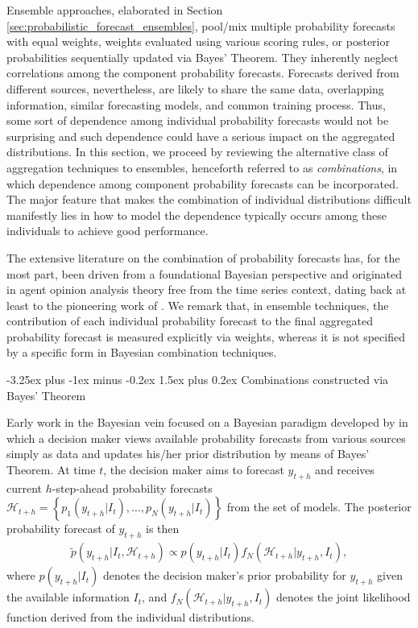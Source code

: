\documentclass[11pt]{article}
\makeatletter
\renewcommand{\paragraph}{\@startsection{paragraph}{4}{0ex}%
   {-3.25ex plus -1ex minus -0.2ex}%
   {1.5ex plus 0.2ex}%
   {\normalfont\normalsize\bfseries}}
\makeatother
\begin{document}
Ensemble approaches, elaborated in Section \ref{sec:probabilistic_forecast_ensembles}, pool/mix multiple probability forecasts with equal weights, weights evaluated using various scoring rules, or posterior probabilities sequentially updated via Bayes' Theorem. They inherently neglect correlations among the component probability forecasts. Forecasts derived from different sources, nevertheless, are likely to share the same data, overlapping information, similar forecasting models, and common training process. Thus, some sort of dependence among individual probability forecasts would not be surprising and such dependence could have a serious impact on the aggregated distributions. In this section, we proceed by reviewing the alternative class of aggregation techniques to ensembles, henceforth referred to as \textit{combinations}, in which dependence among component probability forecasts can be incorporated. The major feature that makes the combination of individual distributions difficult manifestly lies in how to model the dependence typically occurs among these individuals to achieve good performance.

The extensive literature on the combination of probability forecasts has, for the most part, been driven from a foundational Bayesian perspective and originated in agent opinion analysis theory free from the time series context, dating back at least to the pioneering work of \cite{Winkler1968-uw}. We remark that, in ensemble techniques, the contribution of each individual probability forecast to the final aggregated probability forecast is measured explicitly via weights, whereas it is not specified by a specific form in Bayesian combination techniques.

\paragraph{Combinations constructed via Bayes' Theorem}

Early work in the Bayesian vein focused on a Bayesian paradigm developed by \cite{Morris1974-yh,Morris1977-xl} in which a decision maker views available probability forecasts from various sources simply as data and updates his/her prior distribution by means of Bayes' Theorem. At time $t$, the decision maker aims to forecast $y_{t+h}$ and receives current $h$-step-ahead probability forecasts $\mathcal{H}_{t+h} = \left\{p_{1}(y_{t+h}|I_{t}), \ldots, p_{N}(y_{t+h}|I_{t})\right\}$ from the set of models. The posterior probability forecast of $y_{t+h}$ is then
\begin{align}
\label{eq:bayes_theorem}
\tilde{p}\left(y_{t+h} | I_{t}, \mathcal{H}_{t+h}\right) \propto p\left(y_{t+h} | I_{t}\right) f_{N}\left(\mathcal{H}_{t+h} | y_{t+h}, I_{t}\right),
\end{align}
where $p\left(y_{t+h} | I_{t}\right)$ denotes the decision maker's prior probability for $y_{t+h}$ given the available information $I_{t}$, and $f_{N}\left(\mathcal{H}_{t+h} | y_{t+h}, I_{t}\right)$ denotes the joint likelihood function derived from the individual distributions.
\end{document}
